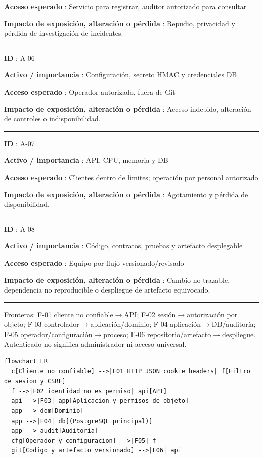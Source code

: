 \documentclass[12pt,a4paper]{report}
\begin{document}
\textbf{Acceso esperado }: Servicio para registrar, auditor autorizado
para consultar

\textbf{Impacto de exposición, alteración o pérdida }: Repudio,
privacidad y pérdida de investigación de incidentes.

\medskip\hrule\medskip

\textbf{ID }: A-06

\textbf{Activo / importancia }: Configuración, secreto HMAC y
credenciales DB

\textbf{Acceso esperado }: Operador autorizado, fuera de Git

\textbf{Impacto de exposición, alteración o pérdida }: Acceso indebido,
alteración de controles o indisponibilidad.

\medskip\hrule\medskip

\textbf{ID }: A-07

\textbf{Activo / importancia }: API, CPU, memoria y DB

\textbf{Acceso esperado }: Clientes dentro de límites; operación por
personal autorizado

\textbf{Impacto de exposición, alteración o pérdida }: Agotamiento y
pérdida de disponibilidad.

\medskip\hrule\medskip

\textbf{ID }: A-08

\textbf{Activo / importancia }: Código, contratos, pruebas y artefacto
desplegable

\textbf{Acceso esperado }: Equipo por flujo versionado/revisado

\textbf{Impacto de exposición, alteración o pérdida }: Cambio no
trazable, dependencia no reproducible o despliegue de artefacto
equivocado.

\medskip\hrule\medskip

Fronteras: F-01 cliente no confiable\ensuremath{\rightarrow}API; F-02 sesión\ensuremath{\rightarrow}autorización por
objeto; F-03 controlador\ensuremath{\rightarrow}aplicación/dominio; F-04
aplicación\ensuremath{\rightarrow}DB/auditoría; F-05 operador/configuración\ensuremath{\rightarrow}proceso; F-06
repositorio/artefacto\ensuremath{\rightarrow}despliegue. Autenticado no significa administrador
ni acceso universal.

\begin{Verbatim}[breaklines=true,breakanywhere=true,fontsize=\footnotesize]
flowchart LR
  c[Cliente no confiable] -->|F01 HTTP JSON cookie headers| f[Filtro de sesion y CSRF]
  f -->|F02 identidad no es permiso| api[API]
  api -->|F03| app[Aplicacion y permisos de objeto]
  app --> dom[Dominio]
  app -->|F04| db[(PostgreSQL principal)]
  app --> audit[Auditoria]
  cfg[Operador y configuracion] -->|F05| f
  git[Codigo y artefacto versionado] -->|F06| api
\end{Verbatim}
\end{document}
